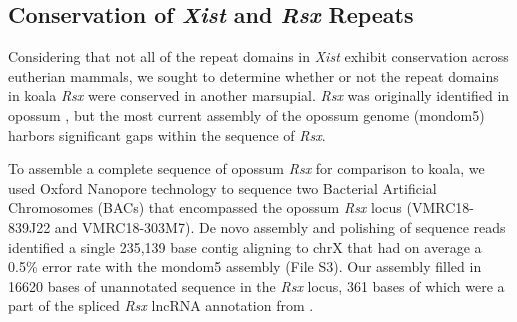 \subsection{Conservation of \emph{Xist} and \emph{Rsx} Repeats}
Considering that not all of the repeat domains in \emph{Xist} exhibit conservation across eutherian mammals, we sought to determine whether or not the repeat domains in koala \emph{Rsx} were conserved in another marsupial. \emph{Rsx} was originally identified in opossum \cite{Grant2012RsxInactivation}, but the most current assembly of the opossum genome (mondom5) harbors significant gaps within the sequence of \emph{Rsx}. 

To assemble a complete sequence of opossum \emph{Rsx} for comparison to koala, we used Oxford Nanopore technology to sequence two Bacterial Artificial Chromosomes (BACs) that encompassed the opossum \emph{Rsx} locus (VMRC18-839J22 and VMRC18-303M7). De novo assembly and polishing of sequence reads identified a single 235,139 base contig aligning to chrX that had on average a 0.5\% error rate with the mondom5 assembly (File S3). Our assembly filled in 16620 bases of unannotated sequence in the \emph{Rsx} locus, 361 bases of which were a part of the spliced \emph{Rsx} lncRNA annotation from \cite{Grant2012RsxInactivation}.


